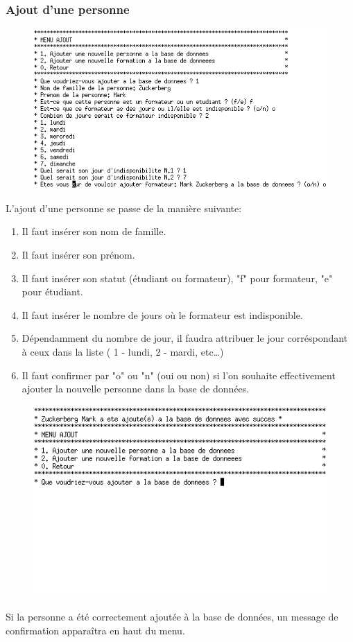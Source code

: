 \documentclass[11pt]{article}
\begin{document}
\subsubsection{Ajout d'une personne}
\begin{figure}[ht]
  \centering
  \includegraphics[scale=0.7]{images/07.png.png}
\end{figure}
L'ajout d'une personne se passe de la manière suivante:
\begin{enumerate}
\item Il faut insérer son nom de famille.
\item Il faut insérer son prénom.
\item Il faut insérer son statut (étudiant ou formateur), "f" pour formateur, "e" pour étudiant.
\item Il faut insérer le nombre de jours où le formateur est indisponible.
\item Dépendamment du nombre de jour, il faudra attribuer le jour corréspondant à ceux dans la liste ( 1 - lundi, 2 - mardi, etc\ldots)
\item Il faut confirmer par "o" ou "n" (oui ou non) si l'on souhaite effectivement ajouter la nouvelle personne dans la base de données.
\end{enumerate}

\begin{figure}[ht]
  \centering
  \includegraphics[trim=0 180 0 10, clip, scale=0.8]{images/08.png.png}
\end{figure}
Si la personne a été correctement ajoutée à la base de données, un message de confirmation apparaîtra en haut du menu.\\
\end{document}
